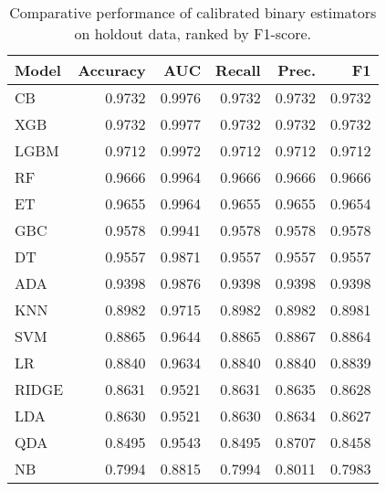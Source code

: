 \begin{table}
\caption{Comparative performance of calibrated binary estimators on holdout data, ranked by F1-score.}
\label{tbl:binary_ho_res_calibrated_models_df}
\begin{tabular}{lrrrrr}
\toprule
Model & Accuracy & AUC & Recall & Prec. & F1 \\
\midrule
CB & 0.9732 & 0.9976 & 0.9732 & 0.9732 & 0.9732 \\
XGB & 0.9732 & 0.9977 & 0.9732 & 0.9732 & 0.9732 \\
LGBM & 0.9712 & 0.9972 & 0.9712 & 0.9712 & 0.9712 \\
RF & 0.9666 & 0.9964 & 0.9666 & 0.9666 & 0.9666 \\
ET & 0.9655 & 0.9964 & 0.9655 & 0.9655 & 0.9654 \\
GBC & 0.9578 & 0.9941 & 0.9578 & 0.9578 & 0.9578 \\
DT & 0.9557 & 0.9871 & 0.9557 & 0.9557 & 0.9557 \\
ADA & 0.9398 & 0.9876 & 0.9398 & 0.9398 & 0.9398 \\
KNN & 0.8982 & 0.9715 & 0.8982 & 0.8982 & 0.8981 \\
SVM & 0.8865 & 0.9644 & 0.8865 & 0.8867 & 0.8864 \\
LR & 0.8840 & 0.9634 & 0.8840 & 0.8840 & 0.8839 \\
RIDGE & 0.8631 & 0.9521 & 0.8631 & 0.8635 & 0.8628 \\
LDA & 0.8630 & 0.9521 & 0.8630 & 0.8634 & 0.8627 \\
QDA & 0.8495 & 0.9543 & 0.8495 & 0.8707 & 0.8458 \\
NB & 0.7994 & 0.8815 & 0.7994 & 0.8011 & 0.7983 \\
\bottomrule
\end{tabular}
\end{table}
